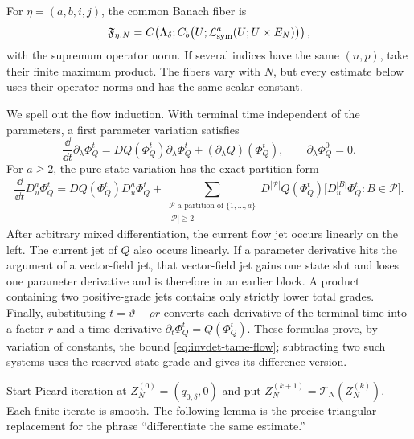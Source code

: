 For \(\eta=(a,b,i,j)\), the common Banach fiber is
\begin{equation}
 \mathfrak F_{\eta,N}
 =C\!\left(\Lambda_\delta;
 C_b\!\left(U;
 \mathcal L_{\rm sym}^a
   (U;U\times E_N)\right)\right),                    \label{eq:invdet-jet-fiber}
\end{equation}
with the supremum operator norm.  If several indices have the same
\((n,p)\), take their finite maximum product.  The fibers vary with \(N\),
but every estimate below uses their operator norms and has the same scalar
constant.

We spell out the flow induction.  With terminal time independent of the
parameters, a first parameter variation satisfies
\begin{equation}
 \frac{\dd}{\dd t}\partial_\lambda\Phi_Q^t
 =DQ(\Phi_Q^t)\partial_\lambda\Phi_Q^t
  +(\partial_\lambda Q)(\Phi_Q^t),
 \qquad \partial_\lambda\Phi_Q^0=0.                 \label{eq:invdet-first-flow-parameter}
\end{equation}
For \(a\geq2\), the pure state variation has the exact partition form
\begin{equation}
 \frac{\dd}{\dd t}D_u^a\Phi_Q^t
 =DQ(\Phi_Q^t)D_u^a\Phi_Q^t
 +\sum_{\substack{\mathcal P\text{ a partition of }\{1,\ldots,a\}\\
                   |\mathcal P|\geq2}}
 D^{|\mathcal P|}Q(\Phi_Q^t)
   \bigl[D_u^{|B|}\Phi_Q^t:B\in\mathcal P\bigr].   \label{eq:invdet-flow-partitions}
\end{equation}
After arbitrary mixed differentiation, the current flow jet occurs linearly
on the left.  The current jet of \(Q\) also occurs linearly.  If a parameter
derivative hits the argument of a vector-field jet, that vector-field jet
gains one state slot and loses one parameter derivative and is therefore in
an earlier block.  A product containing two positive-grade jets contains
only strictly lower total grades.  Finally, substituting
\(t=\vartheta-\rho r\) converts each derivative of the terminal time into a
factor \(r\) and a time derivative
\(\partial_t\Phi_Q^t=Q(\Phi_Q^t)\).  These formulas prove, by variation of
constants, the bound \cref{eq:invdet-tame-flow}; subtracting two such
systems uses the reserved state grade and gives its difference version.

Start Picard iteration at \(Z_N^{(0)}=(q_{0,\delta},0)\) and put
\(Z_N^{(k+1)}=\mathcal T_N(Z_N^{(k)})\).  Each finite iterate is smooth.
The following lemma is the precise triangular replacement for the phrase
``differentiate the same estimate.''

